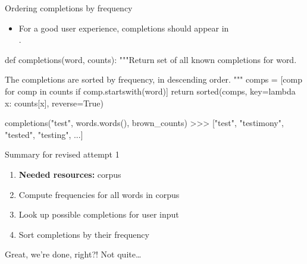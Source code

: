 \documentclass[professionalfonts, xcolor={usenames,svgnames,x11names,table}]{beamer}
\begin{document}
\begin{frame}[fragile]{Ordering completions by frequency}
    \begin{itemize}
        \item For a good user experience, completions should appear in\\
              .
    \end{itemize}

    \begin{pythoncode}
        def completions(word, counts):
            """Return set of all known completions for word.

            The completions are sorted by frequency,
            in descending order.
            """
            comps = [comp for comp in counts
                     if comp.startswith(word)]
            return sorted(comps,
                          key=lambda x: counts[x],
                          reverse=True)
    \end{pythoncode}

    \begin{pythoncode}
        completions("test", words.words(), brown_counts)
        >>> ["test", "testimony", "tested", "testing", ...]
    \end{pythoncode}
\end{frame}

\begin{frame}{Summary for revised attempt 1}
    \begin{enumerate}
        \item \textbf{Needed resources:} corpus
        \item Compute frequencies for all words in corpus
        \item Look up possible completions for user input
        \item Sort completions by their frequency
    \end{enumerate}

    \begin{center}
        Great, we're done, right?! Not quite\ldots
    \end{center}
\end{frame}
\end{document}
